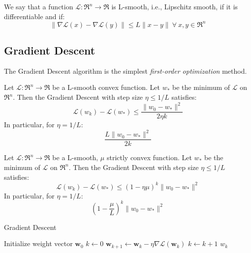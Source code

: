 \begin{definition}[L-smoothness]
We say that a function $\mathcal{L}: \Re^{n} \rightarrow \Re$ is L-smooth, i.e., Lipschitz smooth, if it is differentiable and if:
$$
\| \nabla \mathcal{L}(x) - \nabla \mathcal{L}(y) \| \leq L \| x - y \| \ \forall \ x, y \in \Re^{n}
$$
\end{definition}

\subsection{Gradient Descent}

The Gradient Descent algorithm is the simplest \emph{first-order optimization} method.

\begin{theorem}
Let $\mathcal{L}: \Re^{n} \rightarrow \Re$ be a L-smooth convex function. Let $w_*$ be the minimum of $\mathcal{L}$ on $\Re^{n}$. Then the Gradient Descent with step size $\eta \leq 1/L$ satisfies:
$$
\mathcal{L}(w_k) - \mathcal{L}(w_*) \leq \frac{\| w_0 - w_* \|^2}{2 \eta k}
$$
In particular, for $\eta = 1/L$:
$$
\frac{L \| w_0 - w_* \|^2}{2 k}
$$
\end{theorem}



\begin{theorem}
Let $\mathcal{L}: \Re^{n} \rightarrow \Re$ be a L-smooth, $\mu$ strictly convex function. Let $w_*$ be the minimum of $\mathcal{L}$ on $\Re^{n}$. Then the Gradient Descent with step size $\eta \leq 1/L$ satisfies:
$$
\mathcal{L}(w_k) - \mathcal{L}(w_*) \leq (1 - \eta \mu)^k \| w_0 - w_* \|^2
$$
In particular, for $\eta = 1/L$:
$$
(1 - \frac{\mu}{L})^k \| w_0 - w_* \|^2
$$
\end{theorem}

\begin{algorithm}[H]
	\caption{Gradient Descent}
	\label{alg:gd}
	\begin{algorithmic}
			\State Initialize weight vector $\textbf{w}_0$
			\State $k \gets 0$
				\State $\textbf{w}_{k+1} \gets \textbf{w}_k - \eta \nabla \mathcal{L}(\textbf{w}_k)$
				\State $k \gets k + 1$
			\EndWhile
			\State \Return $w_k$
		\EndFunction
	\end{algorithmic}
\end{algorithm}

